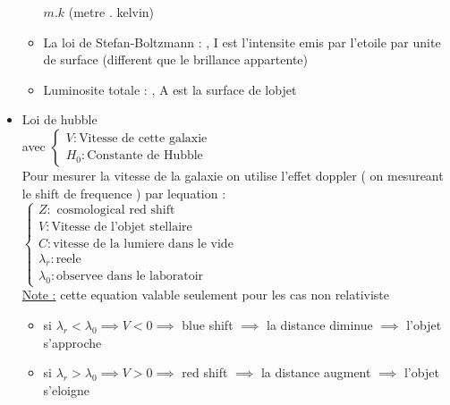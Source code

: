 \documentclass[12pt]{book}
\begin{document}
\begin{itemize}
\begin{itemize}
                         $m.k $ (metre . kelvin)
                    \item La loi de Stefan-Boltzmann :  , I est l'intensite emis par l'etoile par unite de surface (different que le brillance appartente)
                    \item Luminosite totale :  , A est la surface de lobjet
                \end{itemize}
            \item Loi de hubble \\
                 avec $ \begin{cases}
                    V : \text{Vitesse de cette galaxie} \\ H_0 : \text{Constante de Hubble}
                \end{cases} $\\
                Pour mesurer la vitesse de la galaxie on utilise l'effet doppler ( on mesureant le shift de frequence ) par lequation : \\
                $ \begin{cases}
                    Z : \text{ cosmological red shift}\\
                    V : \text{Vitesse de l'objet stellaire}\\
                    C : \text{vitesse de la lumiere dans le vide}\\
                    \lambda_r : \text{reele } \\
                    \lambda_0 : \text{observee dans le laboratoir}
                \end{cases}$\\
                \underline{Note :} cette equation valable seulement pour les cas non relativiste \\
                \begin{itemize}
                    \item si $ \lambda_r < \lambda_0 \implies V<0 \implies $ blue shift $ \implies$  la distance diminue $ \implies $ l'objet s'approche
                    \item si $ \lambda_r > \lambda_0 \implies V>0 \implies $ red shift $ \implies$  la distance augment $ \implies $ l'objet s'eloigne
                \end{itemize}
        \end{itemize}
        
\end{document}
